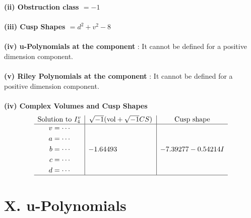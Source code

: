 \documentclass[1p]{elsarticle_modified}
\theoremstyle{definition}
\newcommand{\I}{\sqrt{-1}}
\begin{document}
\flushleft \textbf{(ii) Obstruction class $= -1$}\\~\\
\flushleft \textbf{(iii) Cusp Shapes $= d^2+v^2-8$}\\~\\
\flushleft \textbf{(iv) u-Polynomials at the component} : It cannot be defined for a positive dimension component.\\~\\
\flushleft \textbf{(v) Riley Polynomials at the component} : It cannot be defined for a positive dimension component.\\~\\
\newpage\flushleft \textbf{(iv) Complex Volumes and Cusp Shapes}
$$\begin{array}{c|c|c} 
\text{Solution to }I^v_{4}& \I (\text{vol} + \sqrt{-1}CS) & \text{Cusp shape}\\
 \hline 
\begin{aligned}
v &= \cdots \\
a &= \cdots \\
b &= \cdots \\
c &= \cdots \\
d &= \cdots\end{aligned}
 & -1.64493\phantom{ +0.000000I} & -7.39277 - 0.54214 I\\
 \hline 
 \end{array}
$$
\newpage\renewcommand{\arraystretch}{1}
\centering \section*{ X. u-Polynomials}
\end{document}
